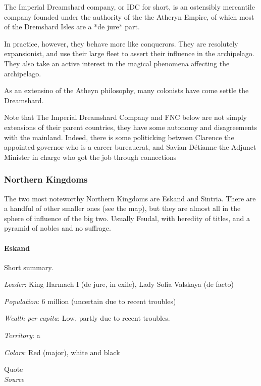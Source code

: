 The Imperial Dreamshard company, or IDC for short, is an ostensibly mercantile company founded under the authority of the the Atheryn Empire, of which most of the Dremshard Isles are a *de jure* part.

In practice, however, they behave more like conquerors. They are resolutely expansionist, and use their large fleet to assert their influence in the archipelago. They also take an active interest in the magical phenomena affecting the archipelago.

As an extensino of the Atheyn philosophy, many colonists have come settle the Dreamshard.


Note that The Imperial Dreamshard Company and FNC below are not simply extensions of their parent countries, they have some autonomy and disagreements with the mainland. Indeed, there is some politicking between Clarence the appointed governor who is a career bureaucrat, and Savian Détianne the Adjunct Minister in charge who got the job through connections



\subsubsection{Northern Kingdoms}

The two most noteworthy Northern Kingdoms are Eskand and Sintria. There are a handful of other smaller ones (see the map), but they are almost all in the sphere of influence of the big two. Usually Feudal, with heredity of titles, and a pyramid of nobles and no suffrage.

\paragraph{Eskand}


Short summary.


\textit{Leader}: King Harmach I (de jure, in exile), Lady Sofia Valskaya (de facto)

\textit{Population}: 6 million (uncertain due to recent troubles)

\textit{Wealth per capita}: Low, partly due to recent troubles.

\textit{Territory}: a
    
\textit{Colors}: Red (major), white and black


\begin{rpg-quotebox}
Quote \\ \textendash \textit{Source}
\end{rpg-quotebox}


